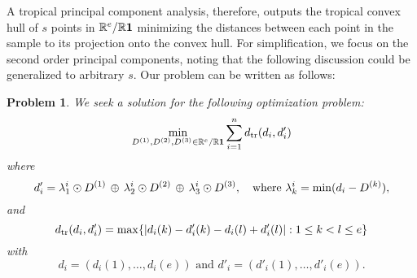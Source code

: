 \documentclass[12pt]{extarticle}
\numberwithin{theorem}{section}
\newtheorem{problem}[theorem]{Problem}
\newcommand{\RR}{\mathbb{R}}
\begin{document}
A tropical principal component analysis, therefore, outputs the tropical convex hull of $s$ points in $\RR^e/\RR {\bf 1}$ minimizing the distances between each
point in the sample to its projection onto the convex hull. For
simplification, we focus on the second order principal components, noting that the following discussion could be generalized to arbitrary $s$. Our problem can be written as follows:
\begin{problem}\label{optimization}
We seek a solution for the following optimization problem:
\[%
\min_{D^{(1)}, D^{(2)}, D^{(3)} \in \RR^e/\RR{\bf 1}} \sum_{i = 1}^n  d_{\rm
  tr}(d_i, d'_i)
\]%
where
\begin{equation}\label{const1:convex}
d'_i= \lambda_1^i \odot  D^{(1)} \,\oplus \,
\lambda_2^i \odot  D^{(2)} \,\oplus \,
\lambda_3^i \odot  D^{(3)}  ,
\quad {\rm where} \,\, \lambda_k^i = {\rm min}(d_i-D^{(k)}) ,
\end{equation}
and 
\begin{equation}\label{const2:convex}
d_{\rm
  tr}(d_i, d'_i) = \max\{|d_i(k) - d'_i(k) - d_i(l) + d'_i(l)|: 1 \leq
k < l \leq e\}
\end{equation}
with 
\begin{equation}\label{const3:convex}
d_i = (d_i(1), \ldots , d_i(e)) \text{ and } d'_i = (d'_i(1), \ldots , d'_i(e)).
\end{equation}
\end{problem}
 \bigskip 
\end{document}
